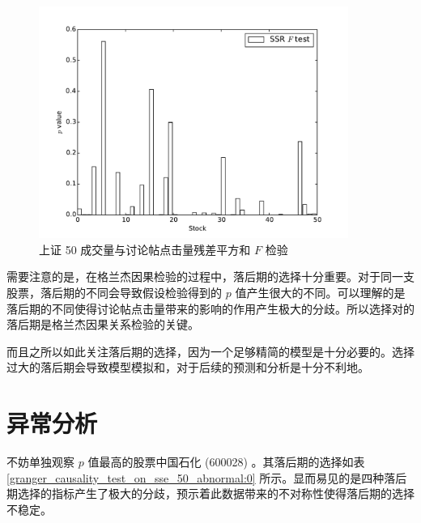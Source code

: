 \begin{figure}
  \centering
  \includegraphics[width=0.9\textwidth]{plots/click_count_volume_granger_causality_test_on_sse_50_ssr_ftest.pdf}
  \caption{上证 50 成交量与讨论帖点击量残差平方和 $F$ 检验}
  \label{f_test:15}
\end{figure}

需要注意的是，在格兰杰因果检验的过程中，落后期的选择十分重要。对于同一支股票，落后期的不同会导致假设检验得到的 $p$ 值产生很大的不同。可以理解的是落后期的不同使得讨论帖点击量带来的影响的作用产生极大的分歧。所以选择对的落后期是格兰杰因果关系检验的关键。

而且之所以如此关注落后期的选择，因为一个足够精简的模型是十分必要的。选择过大的落后期会导致模型模拟和，对于后续的预测和分析是十分不利地。

\section{异常分析}

不妨单独观察 $p$ 值最高的股票中国石化 (600028) 。其落后期的选择如表 \ref{granger_causality_test_on_sse_50_abnormal:0} 所示。显而易见的是四种落后期选择的指标产生了极大的分歧，预示着此数据带来的不对称性使得落后期的选择不稳定。

